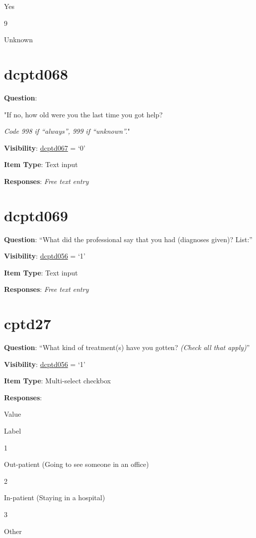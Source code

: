 \documentclass[]{book}
\begin{document}
Yes

9

Unknown

\hypertarget{dcptd068}{%
\section{dcptd068}\label{dcptd068}}

\textbf{Question}:

"If no, how old were you the last time you got help?

\emph{Code 998 if ``always'', 999 if ``unknown''.}"

\textbf{Visibility}: \protect\hyperlink{dcptd067}{dcptd067} = `0'

\textbf{Item Type}: Text input

\textbf{Responses}: \emph{Free text entry}

\hypertarget{dcptd069}{%
\section{dcptd069}\label{dcptd069}}

\textbf{Question}: ``What did the professional say that you had (diagnoses given)? List:''

\textbf{Visibility}: \protect\hyperlink{dcptd056}{dcptd056} = `1'

\textbf{Item Type}: Text input

\textbf{Responses}: \emph{Free text entry}

\hypertarget{cptd27}{%
\section{cptd27}\label{cptd27}}

\textbf{Question}: ``What kind of treatment(s) have you gotten? \emph{(Check all that apply)}''

\textbf{Visibility}: \protect\hyperlink{dcptd056}{dcptd056} = `1'

\textbf{Item Type}: Multi-select checkbox

\textbf{Responses}:

Value

Label

1

Out-patient (Going to see someone in an office)

2

In-patient (Staying in a hospital)

3

Other
\end{document}
